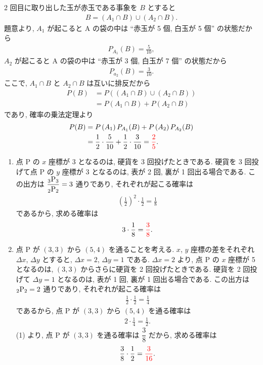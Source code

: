 \begin{qenumerate}
{		2 回目に取り出した玉が赤玉である事象を $B$ とすると
		\begin{align}
			B = \left(A_{1}\cap B\right)\cup\left(A_{2}\cap B\right).
		\end{align}
		題意より, $A_{1}$ が起こると A の袋の中は ``赤玉が 5 個, 白玉が 5 個'' の状態だから
		\begin{align}
			P_{A_{1}}(B) = \frac{5}{10}, 
		\end{align}
		$A_{2}$ が起こると A の袋の中は ``赤玉が 3 個, 白玉が 7 個'' の状態だから
		\begin{align}
			P_{a_{2}}(B) = \frac{3}{10}.
		\end{align}
		ここで, $A_{1}\cap B$ と $A_{2}\cap B$ は互いに排反だから
		\begin{align}
			P(B) &= P\left(\left(A_{1}\cap B\right)\cup\left(A_{2}\cap B\right)\right) \\
				&= P\left(A_{1}\cap B\right) + P\left(A_{2}\cap B\right)
		\end{align}
		であり, 確率の乗法定理より
		\begin{align}
			P(B) &= P\left(A_{1}\right)P_{A_{1}}(B) + P\left(A_{2}\right)P_{A_{2}}(B) \\
				&=\frac{1}{2}\cdot\frac{5}{10} + \frac{1}{2}\cdot\frac{3}{10} = \textcolor{red}{\frac{2}{5}}.
		\end{align}
	}
	\item{
		\begin{enumerate}
			\item{
				点 P の $x$ 座標が 3 となるのは, 硬貨を 3 回投げたときである.
				硬貨を 3 回投げて点 P の $y$ 座標が 3 となるのは, 表が 2 回, 裏が 1 回出る場合である.
				この出方は $\dfrac{{{}_{3}\mathrm{P}_{3}}}{{{}_{2}\mathrm{P}_{2}}} = 3$ 通りであり, それぞれが起こる確率は
				\begin{align}
					\left(\frac{1}{2}\right)^{2}\cdot\frac{1}{2} = \frac{1}{8}
				\end{align}
				であるから, 求める確率は
				\begin{align}
					3\cdot\frac{1}{8} = \textcolor{red}{\frac{3}{8}}.
				\end{align}
			}
			\item{
				点 P が $(3, 3)$ から $(5, 4)$ を通ることを考える.
				$x$, $y$ 座標の差をそれぞれ $\Delta x$, $\Delta y$ とすると, $\Delta x = 2$, $\Delta y = 1$ である.
				$\Delta x = 2$ より, 点 P の $x$ 座標が 5 となるのは, $(3, 3)$ からさらに硬貨を 2 回投げたときである.
				硬貨を 2 回投げて $\Delta y = 1$ となるのは, 表が 1 回, 裏が 1 回出る場合である.
				この出方は ${{}_{2}\mathrm{P}_{2}} = 2$ 通りであり, それぞれが起こる確率は
				\begin{align}
					\frac{1}{2}\cdot\frac{1}{2} = \frac{1}{4}
				\end{align}
				であるから, 点 P が $(3, 3)$ から $(5, 4)$ を通る確率は
				\begin{align}
					2\cdot\frac{1}{4} = \frac{1}{2}.
				\end{align}
				(1) より, 点 P が $(3, 3)$ を通る確率は $\dfrac{3}{8}$ だから, 求める確率は
				\begin{align}
					\frac{3}{8}\cdot\frac{1}{2} = \textcolor{red}{\frac{3}{16}}.
				\end{align}
			}
		\end{enumerate}
	}
\end{qenumerate}
